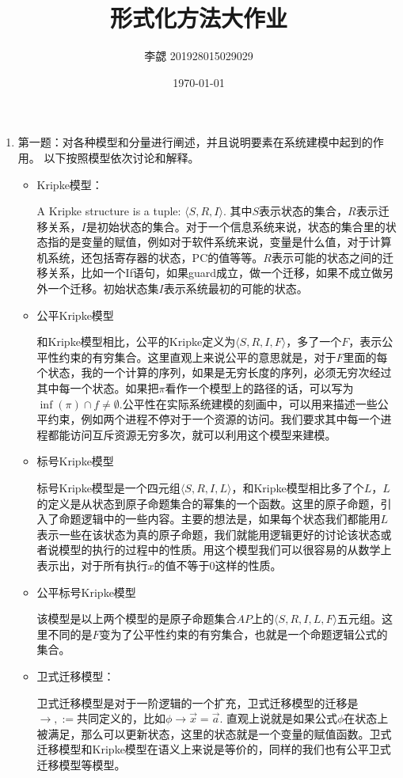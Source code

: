 \documentclass[UTF-8]{ctexart}
\author{李勰 201928015029029}
\title{形式化方法大作业}
\date{\today}
\begin{document}
\maketitle

\begin{enumerate}
\item 第一题：对各种模型和分量进行阐述，并且说明要素在系统建模中起到的作用。
以下按照模型依次讨论和解释。
\begin{itemize}
\item Kripke模型：

A Kripke structure is a tuple: $\langle S, R, I\rangle$. 其中$S$表示状态的集合，$R$表示迁移关系，$I$是初始状态的集合。对于一个信息系统来说，状态的集合里的状态指的是变量的赋值，例如对于软件系统来说，变量是什么值，对于计算机系统，还包括寄存器的状态，PC的值等等。$R$表示可能的状态之间的迁移关系，比如一个If语句，如果guard成立，做一个迁移，如果不成立做另外一个迁移。初始状态集$I$表示系统最初的可能的状态。


\item 公平Kripke模型

和Kripke模型相比，公平的Kripke定义为$\langle S,R,I,F\rangle$，多了一个$F$，表示公平性约束的有穷集合。这里直观上来说公平的意思就是，对于$F$里面的每个状态，我的一个计算的序列，如果是无穷长度的序列，必须无穷次经过其中每一个状态。如果把$\pi$看作一个模型上的路径的话，可以写为$\inf(\pi)\cap f \ne \emptyset$.公平性在实际系统建模的刻画中，可以用来描述一些公平约束，例如两个进程不停对于一个资源的访问。我们要求其中每一个进程都能访问互斥资源无穷多次，就可以利用这个模型来建模。

\item 标号Kripke模型

标号Kripke模型是一个四元组$\langle S,R,I,L\rangle$，和Kripke模型相比多了个$L$，$L$的定义是从状态到原子命题集合的幂集的一个函数。这里的原子命题，引入了命题逻辑中的一些内容。主要的想法是，如果每个状态我们都能用$L$表示一些在该状态为真的原子命题，我们就能用逻辑更好的讨论该状态或者说模型的执行的过程中的性质。用这个模型我们可以很容易的从数学上表示出，对于所有执行$x$的值不等于$0$这样的性质。

\item 公平标号Kripke模型

该模型是以上两个模型的是原子命题集合$AP$上的$\langle S,R,I,L,F\rangle$五元组。这里不同的是$F$变为了公平性约束的有穷集合，也就是一个命题逻辑公式的集合。

\item 卫式迁移模型：

卫式迁移模型是对于一阶逻辑的一个扩充，卫式迁移模型的迁移是$\rightarrow,:=$共同定义的，比如$\phi \rightarrow \vec{x} = \vec{a}$. 直观上说就是如果公式$\phi$在状态上被满足，那么可以更新状态，这里的状态就是一个变量的赋值函数。卫式迁移模型和Kripke模型在语义上来说是等价的，同样的我们也有公平卫式迁移模型等模型。


\end{itemize}
\end{enumerate}
\end{document}
